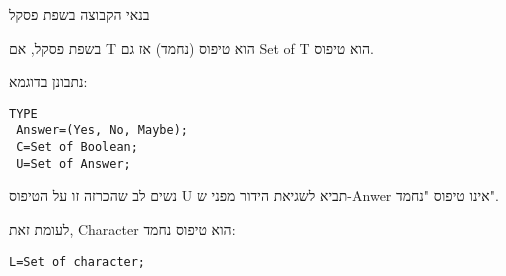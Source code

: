       בנאי הקבוצה בשפת פסקל
      \begin{ציינון}
\item בשפת פסקל, אם T הוא טיפוס (נחמד) אז גם Set of T הוא טיפוס.
\item נתבונן בדוגמא:
    \end{ציינון}

\begin{verbatim}
TYPE
 Answer=(Yes, No, Maybe);
 C=Set of Boolean;
 U=Set of Answer;
\end{verbatim}
      \begin{ציינון}
\item נשים לב שהכרזה זו על הטיפוס U תביא לשגיאת הידור מפני ש-Anwer אינו טיפוס "נחמד".
\item לעומת זאת, Character הוא טיפוס נחמד:
    \end{ציינון}
\begin{verbatim}
L=Set of character;
\end{verbatim}
